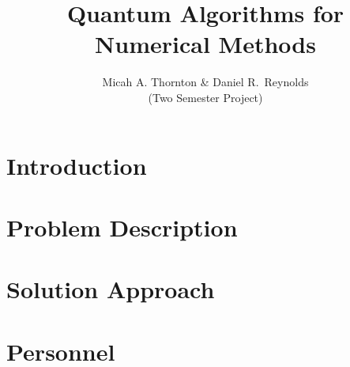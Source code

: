 \documentclass[final]{siamltex}
\title{Quantum Algorithms for Numerical Methods}
\author{Micah A. Thornton \& Daniel R.~Reynolds\\
  (Two Semester Project)
}
\renewcommand{\(}{\left(}
\renewcommand{\)}{\right)}
\begin{document}
\maketitle

\pagestyle{myheadings}
\thispagestyle{plain}


\section{Introduction}
\label{sec:intro}


\section{Problem Description}
\label{sec:problem}


\section{Solution Approach}
\label{sec:solvers}


\section{Personnel}
\label{sec:sam}






\end{document}
